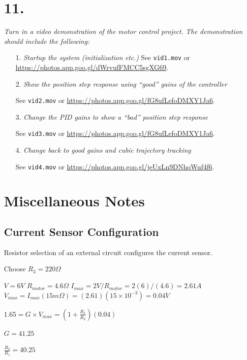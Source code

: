 \documentclass[12pt]{article}
\begin{document}
\section*{11.}
\textit{Turn in a video demonstration of the motor control project.  The demonstration should include the following:}
\begin{enumerate}
    \item[1.]
    \textit{Startup the system (initialization etc.)}
    See \verb|vid1.mov| or \url{https://photos.app.goo.gl/dWrvufFMCC5sgXG69}.

    \item[2.]
    \textit{Show the position step response using “good” gains of the controller}

    See \verb|vid2.mov| or \url{https://photos.app.goo.gl/fG8ufLefoDMXY1Ja6}.

    \item[3.]
    \textit{Change the PID gains to show a “bad” position step response}

    See \verb|vid3.mov| or \url{https://photos.app.goo.gl/fG8ufLefoDMXY1Ja6}.

    \item[4.]
    \textit{Change back to good gains and cubic trajectory tracking}

    See \verb|vid4.mov| or \url{https://photos.app.goo.gl/jeUxLn9DNhqWuf4f6}.

\end{enumerate}


\pagebreak

\section*{Miscellaneous Notes}
\subsection*{Current Sensor Configuration}
Resistor selection of an external circuit configures the current sensor.

Choose $R_3 = 220 \Omega$

$V = 6V$ %
$R_{motor} = 4.6 \Omega$
$I_{max} = 2V/R_{motor} = 2(6)/(4.6) = 2.61A$ %
$V_{max} = I_{max} (15 m\Omega) = (2.61) (15 \times 10^{-3}) = 0.04 V$

$1.65 = G \times V_{max} = (1+\frac{R_1}{R_2}) (0.04)$

$G = 41.25$

$\frac{R_2}{R_1} = 40.25$
\end{document}
